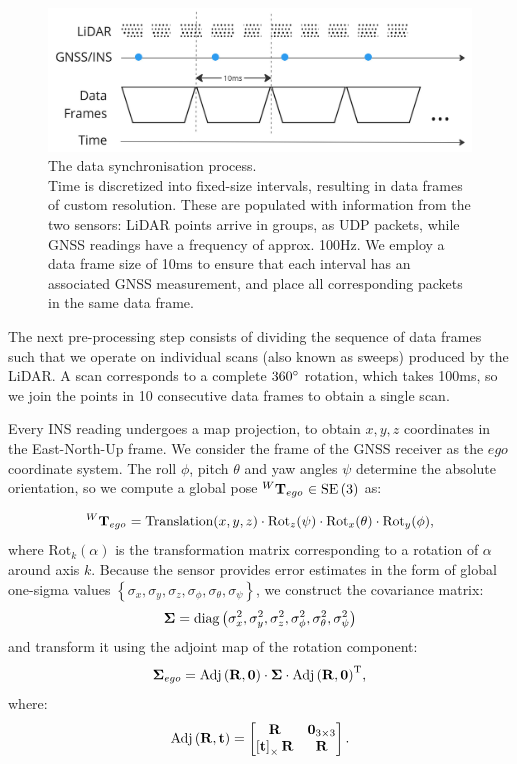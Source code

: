 \begin{figure}
	\centering
	\includegraphics[width=0.7\linewidth]{images/data_sync.jpg}
	\caption[Data frame synchronisation]{The data synchronisation process.\\Time is discretized into fixed-size intervals, resulting in data frames of custom resolution. These are populated with information from the two sensors: LiDAR points arrive in groups, as UDP packets, while GNSS readings have a frequency of approx. 100Hz. We employ a data frame size of 10ms to ensure that each interval has an associated GNSS measurement, and place all corresponding packets in the same data frame.}
	\label{fig:data-sync}
\end{figure}

The next pre-processing step consists of dividing the sequence of data frames such that we operate on individual scans (also known as sweeps) produced by the LiDAR. A scan corresponds to a complete $360 \degree$ rotation, which takes 100ms, so we join the points in 10 consecutive data frames to obtain a single scan.

Every INS reading undergoes a map projection, to obtain $x,y,z$ coordinates in the East-North-Up frame. We consider the frame of the GNSS receiver as the $ego$ coordinate system. The roll $\phi$, pitch $\theta$ and yaw angles $\psi$ determine the absolute orientation, so we compute a global pose ${}^W\mathbf{T}_{{ego}_{}} \in \operatorname{SE}\left(3\right)$ as:

\begin{equation}
	{}^W\mathbf{T}_{{ego}_{}} =
	\text{Translation}(x, y, z) \cdot
	\text{Rot}_{z}(\psi) \cdot
	\text{Rot}_{x}(\theta) \cdot
	\text{Rot}_{y}(\phi)\text{,}
\end{equation}
where $\text{Rot}_k(\alpha)$ is the transformation matrix corresponding to a rotation of $\alpha$ around axis $k$.
Because the sensor provides error estimates in the form of global one-sigma values $\left\{ \sigma_x, \sigma_y, \sigma_z, \sigma_\phi, \sigma_\theta, \sigma_\psi\right\}$, we construct the covariance matrix:
\begin{equation}
	\mathbf{\Sigma} = \text{diag}\left(\sigma^2_{x}, \sigma^2_{y}, \sigma^2_{z}, \sigma^2_{\phi}, \sigma^2_{\theta}, \sigma^2_{\psi}\right)
\end{equation}
and transform it using the adjoint map of the rotation component:
\begin{equation}
	\mathbf{\Sigma}_{ego} =
	\text{Adj}\left(\mathbf{R}, \mathbf{0}\right) \cdot
	\mathbf{\Sigma} \cdot
	{\text{Adj}\left(\mathbf{R}, \mathbf{0}\right)}^\text{T}
	\text{,}
\end{equation}
where:
\begin{equation}
	\text{Adj}\left(\mathbf{R}, \mathbf{t}\right) =
	\begin{bmatrix}
		\mathbf{R}                   & \mathbf{0}_{3\times3} \\
		\left[\mathbf{t}\right]_\times\mathbf{R} & \mathbf{R}
	\end{bmatrix}\text{.}
\end{equation}

